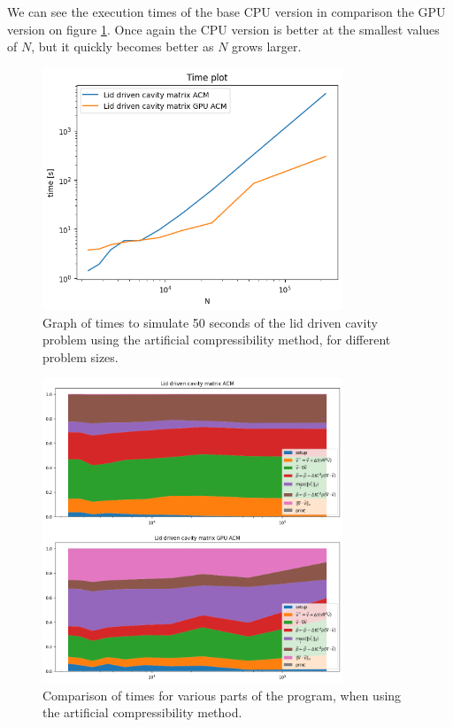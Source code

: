 \documentclass{article}
\begin{document}
We can see the execution times of the base CPU version in comparison the GPU version on figure 
\ref{fig:lidDrivenACM_time}.
Once again the CPU version is better at the smallest values of \(N\), but it quickly becomes 
better as \(N\) grows larger.
\begin{figure}[h!] 
    \centering 
    \includegraphics[width=0.8\textwidth]{plots/lidDrivenACM_time.png} 
    \caption{Graph of times to simulate 50 seconds of the lid driven cavity problem using
    the artificial compressibility method, for different problem sizes.} 
    \label{fig:lidDrivenACM_time} 
\end{figure}
\begin{figure}[h!] 
    \centering 
    \includegraphics[width=0.8\textwidth]{plots/lidDrivenACM_comp.png} 
    \caption{Comparison of times for various parts of the program, when using the artificial compressibility
    method.} 
    \label{fig:lidDrivenACM_comp} 
\end{figure}
\end{document}
